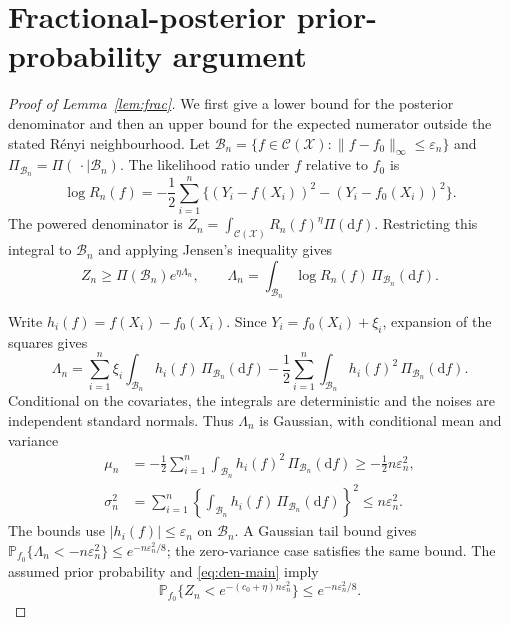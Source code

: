 \documentclass[11pt,a4paper]{article}
\theoremstyle{remark}
\newcommand{\Xcal}{\mathcal X}
\newcommand{\Ccal}{\mathcal C}
\newcommand{\PP}{\mathbb P}
\newcommand{\norm}[1]{\lVert#1\rVert}
\begin{document}
\section{Fractional-posterior prior-probability argument}
\label{app:fractional-proof}

\begingroup
\begin{proof}[Proof of Lemma~\ref{lem:frac}]
We first give a lower bound for the posterior denominator and then
an upper bound for the expected numerator outside the stated
R\'enyi neighbourhood.
Let $\mathcal B_n=\{f\in\Ccal(\Xcal):
\norm{f-f_0}_\infty\leq\varepsilon_n\}$ and
$\Pi_{\mathcal B_n}=\Pi(\,\cdot\mid\mathcal B_n)$.
The likelihood ratio under $f$ relative to $f_0$ is
\[
\log R_n(f)=-\frac12\sum_{i=1}^n
\{(Y_i-f(X_i))^2-(Y_i-f_0(X_i))^2\}.
\]
The powered denominator is
$Z_n=\int_{\Ccal(\Xcal)}R_n(f)^\eta\Pi(\mathrm d f)$.
Restricting this integral to $\mathcal B_n$ and applying Jensen's
inequality gives
\begin{equation}\label{eq:den-main}
Z_n\geq\Pi(\mathcal B_n)e^{\eta\Lambda_n},
\qquad
\Lambda_n=\int_{\mathcal B_n}\log R_n(f)\,
\Pi_{\mathcal B_n}(\mathrm d f).
\end{equation}

Write $h_i(f)=f(X_i)-f_0(X_i)$.
Since $Y_i=f_0(X_i)+\xi_i$, expansion of the squares gives
\[
\Lambda_n
=\sum_{i=1}^n\xi_i\int_{\mathcal B_n}h_i(f)\,
\Pi_{\mathcal B_n}(\mathrm d f)
-\frac12\sum_{i=1}^n\int_{\mathcal B_n}h_i(f)^2\,
\Pi_{\mathcal B_n}(\mathrm d f).
\]
Conditional on the covariates, the integrals are deterministic
and the noises are independent standard normals. Thus
$\Lambda_n$ is Gaussian, with conditional mean and variance
\begin{align*}
\mu_n&=-\frac12\sum_{i=1}^n\int_{\mathcal B_n}h_i(f)^2\,
\Pi_{\mathcal B_n}(\mathrm d f)
\geq-\frac12n\varepsilon_n^2,\\
\sigma_n^2&=\sum_{i=1}^n
\left\{\int_{\mathcal B_n}h_i(f)\,
\Pi_{\mathcal B_n}(\mathrm d f)\right\}^2
\leq n\varepsilon_n^2.
\end{align*}
The bounds use $|h_i(f)|\leq\varepsilon_n$ on $\mathcal B_n$.
A Gaussian tail bound gives
$\PP_{f_0}\{\Lambda_n<-n\varepsilon_n^2\}
\leq e^{-n\varepsilon_n^2/8}$; the zero-variance case satisfies
the same bound. The assumed prior probability and
\eqref{eq:den-main} imply
\begin{equation}\label{eq:den-tail-main}
\PP_{f_0}\{Z_n<e^{-(c_0+\eta)n\varepsilon_n^2}\}
\leq e^{-n\varepsilon_n^2/8}.
\end{equation}


\end{proof}
\end{document}
